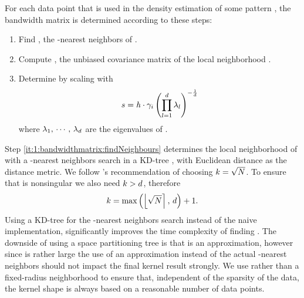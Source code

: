 	For each data point \varPattern[\itXis] that is used in the density estimation of some pattern \varPattern[\itXs], the bandwidth matrix is determined according to these steps:
		\begin{enumerate}[labelindent=0ex]
			\item \label{it:1:bandwidthmatrix:findNeighbours}
				Find \varNeighborhood{\varPattern[\itXis]}, the \KNNK-nearest neighbors of \varPattern[\itXis].
			\item \label{it:1:bandwidthmatrix:initialBandwidthMatrix}
				Compute \varCovarianceMatrix, the unbiased covariance matrix of the local neighborhood \varNeighborhood{\varPattern[\itXis]}.
			\item \label{it:1:bandwidthmatrix:scaleBandwidhtMatrix}
				Determine \varBandwidthMatrix[\itXis] by scaling \varCovarianceMatrix with
				\begin{equation}\label{eq:method:scalingFactor}
					s = \mathit{h} \cdot \gamma_{i} 
				 \left( \displaystyle\prod_{l = 1}^{d} \lambda_{l} \right)^{-\frac{1}{d}}
				\end{equation}
				where $\lambda_1,\, \cdots,\, \lambda_d$ are the eigenvalues of \varCovarianceMatrix.  
		\end{enumerate}	
		Step \ref{it:1:bandwidthmatrix:findNeighbours} determines the local neighborhood of \varPattern[\itXis] with a \KNNK-nearest neighbors search in a KD-tree \cite{Bentley1975Multidimensional}, with Euclidean distance as the distance metric. 
		We follow \citeauthor{silverman1986density}'s \cite{silverman1986density} recommendation of choosing $k = \sqrt{N}$. To ensure that \varCovarianceMatrix is nonsingular we also need $k > d$, therefore
		\begin{equation*}
			k = \max\left(\left\lfloor \sqrt{N} \right\rceil,\, d \right) + 1.	
		\end{equation*}			
		Using a KD-tree for the \KNNK-nearest neighbors search instead of the naive implementation, significantly improves the time complexity of finding \varBandwidthMatrix[\itXis]. The downside of using a space partitioning tree is that \varNeighborhood{\varPattern[\itXis]} is an approximation, however since \KNNK is rather large the use of an approximation instead of the actual \KNNK-nearest neighbors should not impact the final kernel result strongly. 
		We use \KNN rather than a fixed-radius neighborhood to ensure that, independent of the sparsity of the data, the kernel shape is always based on a reasonable number of data points. 
	
